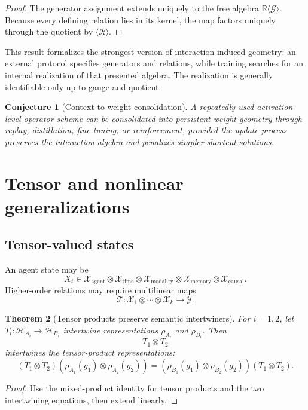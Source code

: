 \documentclass[11pt]{article}
\newtheorem{theorem}{Theorem}[section]
\newtheorem{conjecture}[theorem]{Conjecture}
\theoremstyle{definition}
\theoremstyle{remark}
\newcommand{\Lat}{\mathcal H}
\begin{document}
\begin{proof}
The generator assignment extends uniquely to the free algebra \(\mathbb R\langle\mathcal G\rangle\). Because every defining relation lies in its kernel, the map factors uniquely through the quotient by \(\langle\mathcal R\rangle\).
\end{proof}

This result formalizes the strongest version of interaction-induced geometry: an external protocol specifies generators and relations, while training searches for an internal realization of that presented algebra. The realization is generally identifiable only up to gauge and quotient.

\begin{conjecture}[Context-to-weight consolidation]
A repeatedly used activation-level operator scheme can be consolidated into persistent weight geometry through replay, distillation, fine-tuning, or reinforcement, provided the update process preserves the interaction algebra and penalizes simpler shortcut solutions.
\end{conjecture}

\section{Tensor and nonlinear generalizations}

\subsection{Tensor-valued states}

An agent state may be
\[
X_t\in
\mathcal X_{\mathrm{agent}}
\otimes
\mathcal X_{\mathrm{time}}
\otimes
\mathcal X_{\mathrm{modality}}
\otimes
\mathcal X_{\mathrm{memory}}
\otimes
\mathcal X_{\mathrm{causal}}.
\]
Higher-order relations may require multilinear maps
\[
\mathcal T:
\mathcal X_1\otimes\cdots\otimes\mathcal X_k
\to
\mathcal Y.
\]


\begin{theorem}[Tensor products preserve semantic intertwiners]
For \(i=1,2\), let \(T_i:\Lat_{A_i}\to\Lat_{B_i}\) intertwine representations \(\rho_{A_i}\) and \(\rho_{B_i}\). Then
\[
T_1\otimes T_2
\]
intertwines the tensor-product representations:
\[
(T_1\otimes T_2)
(\rho_{A_1}(g_1)\otimes\rho_{A_2}(g_2))
=
(\rho_{B_1}(g_1)\otimes\rho_{B_2}(g_2))
(T_1\otimes T_2).
\]
\end{theorem}

\begin{proof}
Use the mixed-product identity for tensor products and the two intertwining equations, then extend linearly.
\end{proof}
\end{document}
